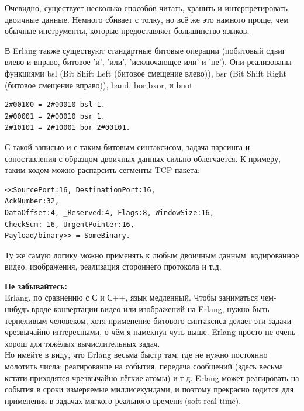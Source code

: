 \documentclass[a4paper,12pt]{report}
\newcommand{\ops}{\colorbox{lgreen}}
\begin{document}
Очевидно, существует несколько способов читать, хранить и интерпретировать двоичные данные. Немного сбивает с толку, но всё же это намного проще, чем обычные инструменты, которые предоставляет большинство языков.

В Erlang также существуют стандартные битовые операции (побитовый сдвиг влево и вправо, битовое 'и', 'или', 'исключающее или' и 'не'). Они реализованы функциями \ops{bsl} (Bit Shift Left (битовое смещение влево)), \ops{bsr} (Bit Shift Right (битовое смещение вправо)), \ops{band}, \ops{bor},\ops{bxor}, и \ops{bnot}.
\begin{lstlisting}[style=repl]
2#00100 = 2#00010 bsl 1.
2#00001 = 2#00010 bsr 1.
2#10101 = 2#10001 bor 2#00101.
\end{lstlisting}

С такой записью и с таким битовым синтаксисом, задача парсинга и сопоставления с образцом двоичных данных сильно облегчается. К примеру, таким кодом можно распарсить сегменты TCP пакета:
\begin{lstlisting}[style=repl]
<<SourcePort:16, DestinationPort:16,
AckNumber:32,
DataOffset:4, _Reserved:4, Flags:8, WindowSize:16,
CheckSum: 16, UrgentPointer:16,
Payload/binary>> = SomeBinary.
\end{lstlisting}

Ту же самую логику можно применять к любым двоичным данным: кодированное видео, изображения, реализация стороннего протокола и т.д.\\ 
\colorbox{lorange}
{
    \begin{minipage}{\linewidth}
        \textbf{Не забывайтесь:}\\ 
        Erlang, по сравнению с С и С++, язык медленный. Чтобы заниматься чем\--нибудь вроде конвертации видео или изображений на Erlang, нужно быть терпеливым человеком, хотя применение битового синтаксиса делает эти задачи чрезвычайно интересными, о чём я намекнул чуть выше. Erlang просто не очень хорош для тяжёлых вычислительных задач.\\ 
        Но имейте в виду, что Erlang весьма быстр там, где не нужно постоянно молотить числа: реагирование на события, передача сообщений (здесь весьма кстати приходятся чрезвычайно лёгкие атомы) и т.д. Erlang может реагировать на события в сроки измеряемые миллисекундами, и поэтому прекрасно годится для применения в задачах мягкого реального времени (soft real time).\\ 
    \end{minipage}
}
\end{document}
